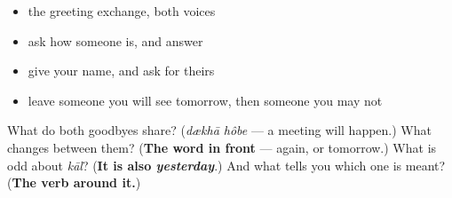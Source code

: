 \begin{itemize}
\raggedright
  \item the greeting exchange, both voices
  \item ask how someone is, and answer
  \item give your name, and ask for theirs
  \item leave someone you will see tomorrow, then someone you may not
\end{itemize}

\begin{tcolorbox}[breakable,colback=teal!4,colframe=teal!35!black,title={Before you move on}]
What do both goodbyes share? (\emph{dækhā hôbe} — a meeting will happen.) What changes between them? (\textbf{The word in front} — again, or tomorrow.) What is odd about \emph{kāl}? (\textbf{It is also \emph{yesterday}}.) And what tells you which one is meant? (\textbf{The verb around it.})
\end{tcolorbox}

